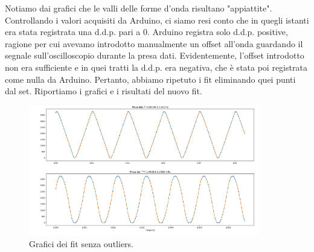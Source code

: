 \documentclass{article}[a4paper, oneside,11pt]
\begin{document}
        \noindent Notiamo dai grafici che le valli delle forme d'onda risultano "appiattite". Controllando i valori acquisiti da Arduino, ci siamo resi conto che in quegli istanti era stata registrata una d.d.p. pari a 0. Arduino registra solo d.d.p. positive, ragione per cui avevamo introdotto manualmente un offset all'onda guardando il segnale sull'oscilloscopio durante la presa dati. Evidentemente, l'offset introdotto non era sufficiente e in quei tratti la d.d.p. era negativa, che è stata poi registrata come nulla da Arduino. Pertanto, abbiamo ripetuto i fit eliminando quei punti dal set. Riportiamo i grafici e i risultati del nuovo fit. 
        
    \begin{figure}[H]
        \centering
        \includegraphics[width=0.9\textwidth]{img/Fit-T-tagliato.png}
        \caption{Grafici dei fit senza outliers.}
    \end{figure}
\end{document}
